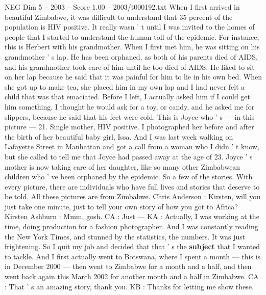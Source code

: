 \begin{textsample}{NEG Dim 5 – 2003 – Score 1.00 – 2003/t000192.txt}  \label{ex:f5_neg_059}
When I first arrived in beautiful Zimbabwe, it was difficult to understand that 35 percent of the population is HIV positive.
It really wasn ' t until I was invited to the homes of people that I started to understand the human toll of the epidemic.
For instance, this is Herbert with his grandmother.
When I first met him, he was sitting on his grandmother ' s lap.
He has been orphaned, as both of his parents died of AIDS, and his grandmother took care of him until he too died of AIDS.
He liked to sit on her lap because he said that it was painful for him to lie in his own bed.
When she got up to make tea, she placed him in my own lap and I had never felt a child that was that emaciated.
Before I left, I actually asked him if I could get him something.
I thought he would ask for a toy, or candy, and he asked me for slippers, because he said that his feet were cold.
This is Joyce who ' s — in this picture — 21.
Single mother, HIV positive.
I photographed her before and after the birth of her beautiful baby girl, Issa.
And I was last week walking on Lafayette Street in Manhattan and got a call from a woman who I didn ' t know, but she called to tell me that Joyce had passed away at the age of 23.
Joyce ' s mother is now taking care of her daughter, like so many other Zimbabwean children who ' ve been orphaned by the epidemic.
So a few of the stories.
With every picture, there are individuals who have full lives and stories that deserve to be told.
All these pictures are from Zimbabwe.
Chris Anderson : Kirsten, will you just take one minute, just to tell your own story of how you got to Africa?
Kirsten Ashburn : Mmm, gosh.
CA : Just — KA : Actually, I was working at the time, doing production for a fashion photographer.
And I was constantly reading the New York Times, and stunned by the statistics, the numbers.
It was just frightening.
So I quit my job and decided that that ' s the \textbf{subject} that I wanted to tackle.
And I first actually went to Botswana, where I spent a month — this is in December 2000 — then went to Zimbabwe for a month and a half, and then went back again this March 2002 for another month and a half in Zimbabwe.
CA : That ' s an amazing story, thank you.
KB : Thanks for letting me show these.

\end{textsample}
